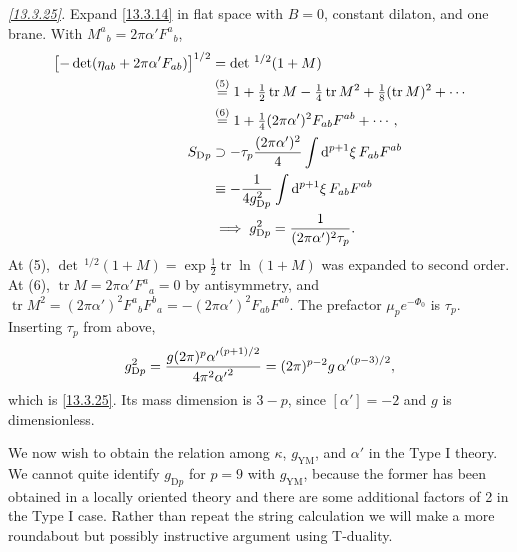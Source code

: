 \begin{tcolorbox}[breakable]
\begin{remark}
		\textit{\eqref{13.3.25}.} Expand \eqref{13.3.14} in flat space with $B=0$, constant dilaton, and one brane. With $M^a{}_b=2\pi\alpha'F^a{}_b$,
		\begin{align*}
			\bigl[-\det(\eta_{ab}+2\pi\alpha'F_{ab})\bigr]^{1/2} &= \det\,^{1/2}(1 + M) \\ &\overset{(5)}{=} 1+\tfrac12\operatorname{tr}M-\tfrac14\operatorname{tr}M^2+\tfrac18(\operatorname{tr}M)^2+\cdots\\
			&\overset{(6)}{=} 1+\tfrac14(2\pi\alpha')^2F_{ab}F^{ab}+\cdots ,\\
			S_{\rm D\it p} &\supset -\tau_p\frac{(2\pi\alpha')^2}{4}\int\mathrm{d}^{p+1}\xi\,F_{ab}F^{ab}\\ &\equiv -\frac{1}{4g_{{\rm D}p}^2}\int\mathrm{d}^{p+1}\xi\,F_{ab}F^{ab}\\
			&\;\Longrightarrow\; g_{{\rm D}p}^2=\frac{1}{(2\pi\alpha')^2\tau_p} .
		\end{align*}
		At (5), $\det\,^{1/2}(1 + M)=\exp\frac12\operatorname{tr}\ln(1+M)$ was expanded to second order. At (6), $\operatorname{tr}M=2\pi\alpha'F^a{}_a=0$ by antisymmetry, and $\operatorname{tr}M^2=(2\pi\alpha')^2F^a{}_bF^b{}_a=-(2\pi\alpha')^2F_{ab}F^{ab}$. The prefactor $\mu_pe^{-\Phi_0}$ is $\tau_p$. Inserting $\tau_p$ from above,
		\begin{equation*}
			g_{{\rm D}p}^2 = \frac{g(2\pi)^p{\alpha'}^{(p+1)/2}}{4\pi^2{\alpha'}^2} = (2\pi)^{p-2}g\,{\alpha'}^{(p-3)/2},
		\end{equation*}
		which is \eqref{13.3.25}. Its mass dimension is $3-p$, since $[\alpha']=-2$ and $g$ is dimensionless.
	\end{remark}
\end{tcolorbox}

We now wish to obtain the relation among $\kappa$, $g_{\mathrm{YM}}$, and $\alpha'$ in the Type I theory. We cannot quite identify $g_{\mathrm{D}p}$ for $p = 9$ with $g_{\mathrm{YM}}$, because the former has been obtained in a locally oriented theory and there are some additional factors of 2 in the Type I case. Rather than repeat the string calculation we will make a more roundabout but possibly instructive argument using T-duality.

